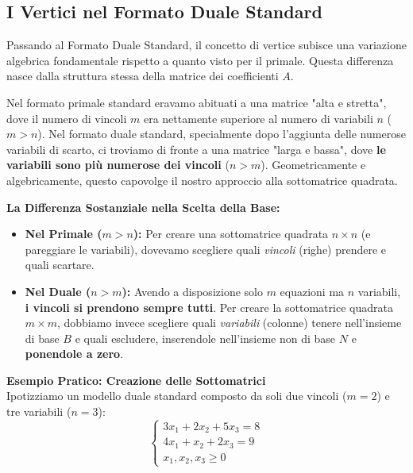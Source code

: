 \documentclass[12pt, a4paper]{article}
\begin{document}
	\vspace{0.6cm}
	\subsection*{I Vertici nel Formato Duale Standard}
	
	Passando al Formato Duale Standard, il concetto di vertice subisce una variazione algebrica fondamentale rispetto a quanto visto per il primale. Questa differenza nasce dalla struttura stessa della matrice dei coefficienti $A$.
	
	Nel formato primale standard eravamo abituati a una matrice "alta e stretta", dove il numero di vincoli $m$ era nettamente superiore al numero di variabili $n$ ($m > n$). Nel formato duale standard, specialmente dopo l'aggiunta delle numerose variabili di scarto, ci troviamo di fronte a una matrice "larga e bassa", dove \textbf{le variabili sono più numerose dei vincoli} ($n > m$). Geometricamente e algebricamente, questo capovolge il nostro approccio alla sottomatrice quadrata.
	
	\textbf{La Differenza Sostanziale nella Scelta della Base:}\\
	\begin{itemize}[label=\textcolor{titlecolor}{\Large\textbullet}, itemsep=4pt, leftmargin=1.5cm]
		\item \textbf{Nel Primale ($m > n$):} Per creare una sottomatrice quadrata $n \times n$ (e pareggiare le variabili), dovevamo scegliere quali \textit{vincoli} (righe) prendere e quali scartare. 
		\item \textbf{Nel Duale ($n > m$):} Avendo a disposizione solo $m$ equazioni ma $n$ variabili, \textbf{i vincoli si prendono sempre tutti}. Per creare la sottomatrice quadrata $m \times m$, dobbiamo invece scegliere quali \textit{variabili} (colonne) tenere nell'insieme di base $B$ e quali escludere, inserendole nell'insieme non di base $N$ e \textbf{ponendole a zero}.
	\end{itemize}
	
	\vspace{0.4cm}
	\textbf{Esempio Pratico: Creazione delle Sottomatrici}\\
	Ipotizziamo un modello duale standard composto da soli due vincoli ($m=2$) e tre variabili ($n=3$):
	\[
	\begin{cases}
		3x_1 + 2x_2 + 5x_3 = 8 \\
		4x_1 + x_2 + 2x_3 = 9 \\
		x_1, x_2, x_3 \geq 0
	\end{cases}
	\]
	
\end{document}

